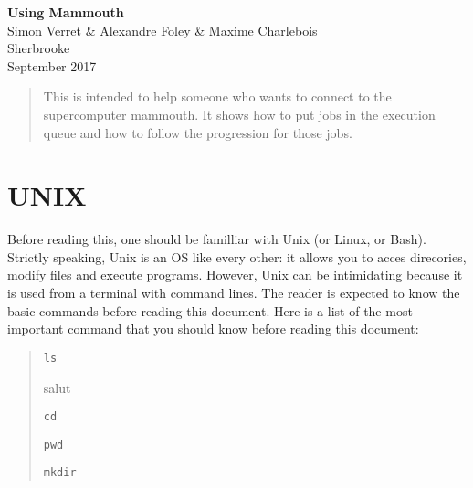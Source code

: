 \documentclass[10pt,letter]{article}
\begin{document}

\begin{centering}

\Large{\textbf{Using Mammouth}}\\
\normalsize{Simon Verret \& Alexandre Foley \& Maxime Charlebois}\\
\small{Sherbrooke\\ September 2017}

\end{centering}



\begin{abstract}
This is intended to help someone who wants to connect to the supercomputer mammouth. It shows how to put jobs in the execution queue and how to follow the progression for those jobs.
\end{abstract}

\tableofcontents

\renewcommand{\baselinestretch}{1.00}
\setlength{\parskip}{0.8\baselineskip}
\setlength{\parindent}{0mm}


\vspace{2mm}

\section{UNIX}
Before reading this, one should be familliar with Unix (or Linux, or Bash). 
Strictly speaking, Unix is an OS like every other: it allows you to acces direcories, modify files and execute programs. 
However, Unix can be intimidating because it is used from a terminal with command lines.
The reader is expected to know the basic commands before reading this document. Here is a list of the most important command that you should know before reading this document:
\begin{quote}
\begin{verbatim}ls\end{verbatim} salut
\begin{verbatim}cd\end{verbatim}
\begin{verbatim}pwd\end{verbatim}
\begin{verbatim}mkdir\end{verbatim}
\end{quote}
\end{document}
